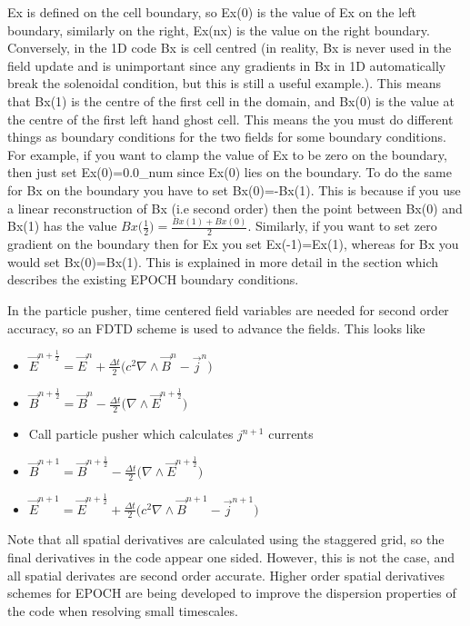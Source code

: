 \documentclass[12pt]{article}
\newcommand{\nEPOCH}{{\color{warwickdark}\fontfamily{phv}\selectfont EPOCH}}
\newcommand{\EPOCH}{{\nEPOCH} }
\begin{document}
Ex is defined on the cell boundary, so Ex(0) is the value of Ex on the left
boundary, similarly on the right, Ex(nx) is the value on the right
boundary. Conversely, in the 1D code Bx is cell centred (in reality, Bx is
never used in the field update and is unimportant since any gradients in Bx in
1D automatically break the solenoidal condition, but this is still a useful
example.). This means that Bx(1) is the centre of the first cell in the domain,
and Bx(0) is the value at the centre of the first left hand ghost cell. This
means the you must do different things as boundary conditions for the two
fields for some boundary conditions.\\

For example, if you want to clamp the value of Ex to be zero on the boundary,
then just set Ex(0)=0.0\_num since Ex(0) lies on the boundary. To do the same
for Bx on the boundary you have to set Bx(0)=-Bx(1). This is because if you use
a linear reconstruction of Bx (i.e second order) then the point between Bx(0)
and Bx(1) has the value $Bx\bigl( \frac{1}{2} \bigr) =
\frac{Bx(1)+Bx(0)}{2}$. Similarly, if you want to set zero gradient on the
boundary then for Ex you set Ex(-1)=Ex(1), whereas for Bx you would set
Bx(0)=Bx(1). This is explained in more detail in the section which describes
the existing \EPOCH boundary conditions.

In the particle pusher, time centered field variables are needed for second
order accuracy, so an FDTD scheme is used to advance the fields. This looks
like

\begin{itemize}
\item $\vec{E}^{n+\frac{1}{2}} = \vec{E}^n + \frac{\Delta t}{2} \bigl( c^2
  \nabla \wedge \vec{B}^{n} -\vec{j}^{n} \bigr)$
\item $\vec{B}^{n+\frac{1}{2}} = \vec{B}^n - \frac{\Delta t}{2} \bigl( \nabla
  \wedge \vec{E}^{n+\frac{1}{2}} \bigr)$
\item Call particle pusher which calculates $j^{n+1}$ currents
\item $\vec{B}^{n+1} = \vec{B}^{n+\frac{1}{2}} - \frac{\Delta t}{2} \bigl(
  \nabla \wedge \vec{E}^{n+\frac{1}{2}} \bigr)$
\item $\vec{E}^{n+1} = \vec{E}^{n+\frac{1}{2}} + \frac{\Delta t}{2} \bigl( c^2
  \nabla \wedge \vec{B} ^{n+1} - \vec{j}^{n+1} \bigr)$
\end{itemize}
Note that all spatial derivatives are calculated using the staggered grid, so
the final derivatives in the code appear one sided. However, this is not the
case, and all spatial derivates are second order accurate. Higher order spatial
derivatives schemes for \EPOCH are being developed to improve the dispersion
properties of the code when resolving small timescales.
\end{document}
